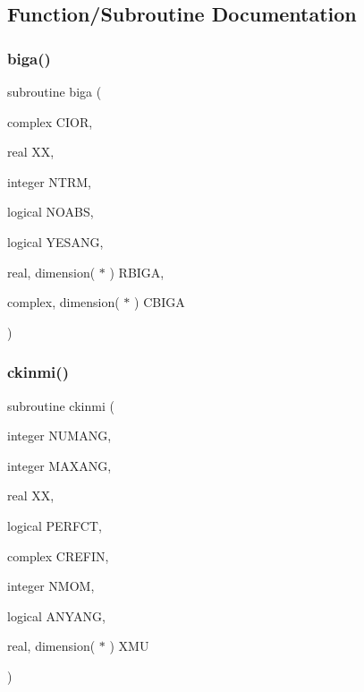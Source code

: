 \subsection{Function/\+Subroutine Documentation}
\mbox{\label{_m_i_e_v0no_p_8f_affcbe26d3e8beb59e07c207f2b0da43a}} 
\subsubsection{\texorpdfstring{biga()}{biga()}}
{\footnotesize\ttfamily subroutine biga (\begin{DoxyParamCaption}\item[{complex}]{C\+I\+OR,  }\item[{real}]{XX,  }\item[{integer}]{N\+T\+RM,  }\item[{logical}]{N\+O\+A\+BS,  }\item[{logical}]{Y\+E\+S\+A\+NG,  }\item[{real, dimension( $\ast$ )}]{R\+B\+I\+GA,  }\item[{complex, dimension( $\ast$ )}]{C\+B\+I\+GA }\end{DoxyParamCaption})}

\mbox{\label{_m_i_e_v0no_p_8f_a06fe91ee97b1295c97915feaad0d2e13}} 
\subsubsection{\texorpdfstring{ckinmi()}{ckinmi()}}
{\footnotesize\ttfamily subroutine ckinmi (\begin{DoxyParamCaption}\item[{integer}]{N\+U\+M\+A\+NG,  }\item[{integer}]{M\+A\+X\+A\+NG,  }\item[{real}]{XX,  }\item[{logical}]{P\+E\+R\+F\+CT,  }\item[{complex}]{C\+R\+E\+F\+IN,  }\item[{integer}]{N\+M\+OM,  }\item[{logical}]{A\+N\+Y\+A\+NG,  }\item[{real, dimension( $\ast$ )}]{X\+MU }\end{DoxyParamCaption})}

